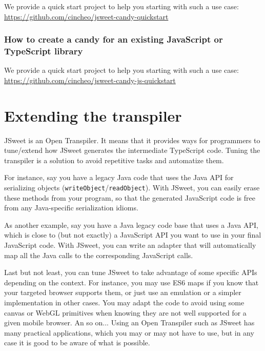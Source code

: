 \documentclass[a4paper]{report}
\begin{document}
We provide a quick start project to help you starting with such a use case: \url{https://github.com/cincheo/jsweet-candy-quickstart}

\subsection{How to create a candy for an existing JavaScript or TypeScript library}

We provide a quick start project to help you starting with such a use case: \url{https://github.com/cincheo/jsweet-candy-js-quickstart}

\chapter{Extending the transpiler}
\label{extending-the-transpiler}

JSweet is an Open Transpiler. It means that it provides ways for programmers to tune/extend how JSweet generates the intermediate TypeScript code. Tuning the transpiler is a solution to avoid repetitive tasks and automatize them.

For instance, say you have a legacy Java code that uses the Java API for serializing objects (\texttt{writeObject}/\texttt{readObject}). With JSweet, you can easily erase these methods from your program, so that the generated JavaScript code is free from any Java-specific serialization idioms. 

As another example, say you have a Java legacy code base that uses a Java API, which is close to (but not exactly) a JavaScript API you want to use in your final JavaScript code. With JSweet, you can write an adapter that will automatically map all the Java calls to the corresponding JavaScript calls. 

Last but not least, you can tune JSweet to take advantage of some specific APIs depending on the context. For instance, you may use ES6 maps if you know that your targeted browser supports them, or just use an emulation or a simpler implementation in other cases. You may adapt the code to avoid using some canvas or WebGL primitives when knowing they are not well supported for a given mobile browser. An so on... Using an Open Transpiler such as JSweet has many practical applications, which you may or may not have to use, but in any case it is good to be aware of what is possible.
\end{document}
